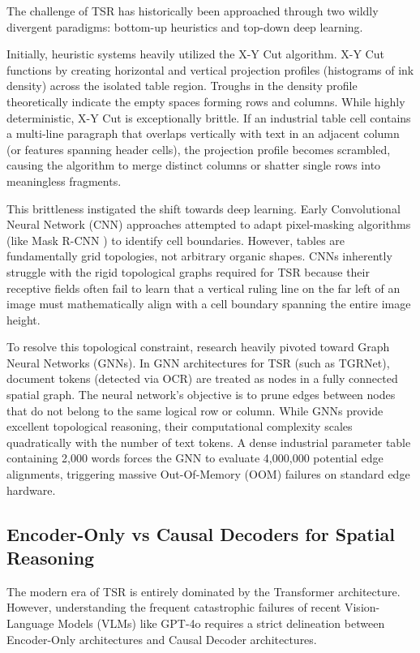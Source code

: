 The challenge of TSR has historically been approached through two wildly divergent paradigms: bottom-up heuristics and top-down deep learning.

Initially, heuristic systems heavily utilized the X-Y Cut algorithm. X-Y Cut functions by creating horizontal and vertical projection profiles (histograms of ink density) across the isolated table region. Troughs in the density profile theoretically indicate the empty spaces forming rows and columns. While highly deterministic, X-Y Cut is exceptionally brittle. If an industrial table cell contains a multi-line paragraph that overlaps vertically with text in an adjacent column (or features spanning header cells), the projection profile becomes scrambled, causing the algorithm to merge distinct columns or shatter single rows into meaningless fragments.

This brittleness instigated the shift towards deep learning. Early Convolutional Neural Network (CNN) approaches attempted to adapt pixel-masking algorithms (like Mask R-CNN \citep{matterport_maskrcnn}) to identify cell boundaries. However, tables are fundamentally grid topologies, not arbitrary organic shapes. CNNs inherently struggle with the rigid topological graphs required for TSR because their receptive fields often fail to learn that a vertical ruling line on the far left of an image must mathematically align with a cell boundary spanning the entire image height.

To resolve this topological constraint, research heavily pivoted toward Graph Neural Networks (GNNs). In GNN architectures for TSR (such as TGRNet), document tokens (detected via OCR) are treated as nodes in a fully connected spatial graph. The neural network's objective is to prune edges between nodes that do not belong to the same logical row or column. While GNNs provide excellent topological reasoning, their computational complexity scales quadratically with the number of text tokens. A dense industrial parameter table containing 2,000 words forces the GNN to evaluate 4,000,000 potential edge alignments, triggering massive Out-Of-Memory (OOM) failures on standard edge hardware.

\subsection{Encoder-Only vs Causal Decoders for Spatial Reasoning}
\label{subsec:encoder_vs_decoder}

The modern era of TSR is entirely dominated by the Transformer architecture. However, understanding the frequent catastrophic failures of recent Vision-Language Models (VLMs) like GPT-4o requires a strict delineation between Encoder-Only architectures and Causal Decoder architectures.

